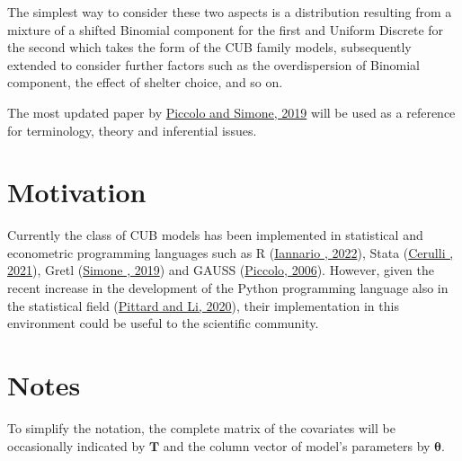 \documentclass[letterpaper,10pt,english]{sphinxmanual}
\begin{document}
\sphinxAtStartPar
The simplest way to consider these
two aspects is a distribution resulting from a
mixture of a shifted Binomial component for the first and Uniform Discrete for the
second which takes the form of the CUB family models, subsequently
extended to consider further factors such as the overdispersion of
Binomial component, the effect of shelter choice, and so on.

\sphinxAtStartPar
The most updated paper by \hyperlink{cite.references:id3}{Piccolo and Simone, 2019} will be used as a reference for
terminology, theory and inferential issues.


\section{Motivation}
\label{\detokenize{intro:motivation}}
\sphinxAtStartPar
Currently the class of CUB models has been implemented in statistical and econometric programming languages
such as R (\hyperlink{cite.references:id22}{Iannario , 2022}), Stata (\hyperlink{cite.references:id28}{Cerulli , 2021}),
Gretl (\hyperlink{cite.references:id29}{Simone , 2019})
and GAUSS (\hyperlink{cite.references:id7}{Piccolo, 2006}).  However, given the recent increase in the development
of the Python programming language also in the statistical field (\hyperlink{cite.references:id27}{Pittard and Li, 2020}),
their implementation in
this environment could be useful to the scientific community.


\section{Notes}
\label{\detokenize{intro:notes}}
\sphinxAtStartPar
To simplify the notation, the complete matrix of the covariates will be occasionally
indicated by \(\pmb T\) and the column vector of model’s parameters by \(\pmb\theta\).
\end{document}

